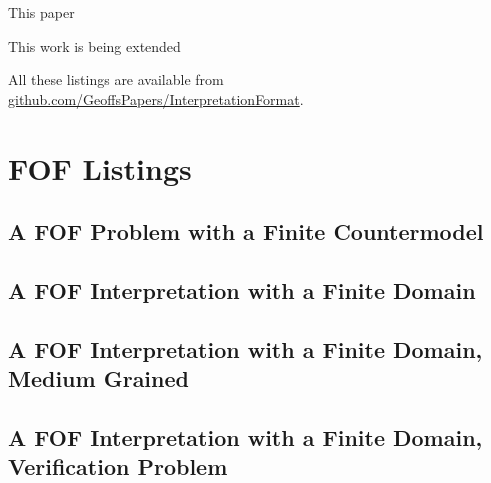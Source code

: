 \documentclass{easychair}
\begin{document}
This paper 

This work is being extended 



\newpage
\appendix

All these listings are available from
\href{https://github.com/GeoffsPapers/InterpretationFormat}{github.com/GeoffsPapers/InterpretationFormat}.

\section{FOF Listings}
\label{FOFListings}

\subsection{A FOF Problem with a Finite Countermodel}
\begin{small}

\end{small}

\newpage
\subsection{A FOF Interpretation with a Finite Domain}
\begin{small}

\end{small}

\newpage
\subsection{A FOF Interpretation with a Finite Domain, Medium Grained}
\begin{small}

\end{small}

\newpage
\subsection{A FOF Interpretation with a Finite Domain, Verification Problem}
\begin{small}

\end{small}

\newpage
\end{document}
